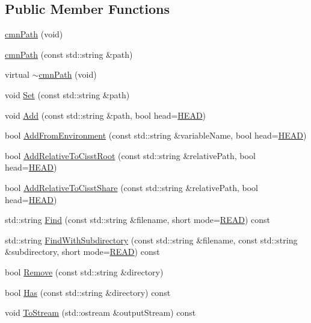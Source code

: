 \subsection*{Public Member Functions}
\begin{DoxyCompactItemize}
\item 
\hyperlink{classcmn_path_ae7372aae252f17f219353fddbbedabf8}{cmn\+Path} (void)
\item 
\hyperlink{classcmn_path_ac59578e065ce38a729b59fa9827619b0}{cmn\+Path} (const std\+::string \&path)
\item 
virtual \hyperlink{classcmn_path_aa518198d8cfca3efe29c53ecc4643fc5}{$\sim$cmn\+Path} (void)
\item 
void \hyperlink{classcmn_path_a322c6bb770d1c4eab76e607d1a1c42cc}{Set} (const std\+::string \&path)
\item 
void \hyperlink{classcmn_path_a9befae06a868615a5df0442298014db6}{Add} (const std\+::string \&path, bool head=\hyperlink{group__cisst_common_ggac052729bcebb4fcdcef7eaaa81c21ab9a53c54bb785ea4ed82a051ce4508f152a}{H\+E\+A\+D})
\item 
bool \hyperlink{classcmn_path_a98560267f6ffa9994df283b333cad870}{Add\+From\+Environment} (const std\+::string \&variable\+Name, bool head=\hyperlink{group__cisst_common_ggac052729bcebb4fcdcef7eaaa81c21ab9a53c54bb785ea4ed82a051ce4508f152a}{H\+E\+A\+D})
\item 
bool \hyperlink{classcmn_path_ac698e3725043e5f588cc10bc1e6c32a5}{Add\+Relative\+To\+Cisst\+Root} (const std\+::string \&relative\+Path, bool head=\hyperlink{group__cisst_common_ggac052729bcebb4fcdcef7eaaa81c21ab9a53c54bb785ea4ed82a051ce4508f152a}{H\+E\+A\+D})
\item 
bool \hyperlink{classcmn_path_a755f7ec7bdae368f1a63bcfbfcfd826e}{Add\+Relative\+To\+Cisst\+Share} (const std\+::string \&relative\+Path, bool head=\hyperlink{group__cisst_common_ggac052729bcebb4fcdcef7eaaa81c21ab9a53c54bb785ea4ed82a051ce4508f152a}{H\+E\+A\+D})
\item 
std\+::string \hyperlink{classcmn_path_a9a6b0ab7944a7fbb24485f8bf0769f1d}{Find} (const std\+::string \&filename, short mode=\hyperlink{group__cisst_common_gga15dacf9562d80d5b7eb9b849726e768caea0bb09a4a02da90f6c172531cd17a05}{R\+E\+A\+D}) const 
\item 
std\+::string \hyperlink{classcmn_path_a4f22b53ac0299045f641a4358999bc58}{Find\+With\+Subdirectory} (const std\+::string \&filename, const std\+::string \&subdirectory, short mode=\hyperlink{group__cisst_common_gga15dacf9562d80d5b7eb9b849726e768caea0bb09a4a02da90f6c172531cd17a05}{R\+E\+A\+D}) const 
\item 
bool \hyperlink{classcmn_path_a9bf81a4e84a5dfb0155931c62b6b202f}{Remove} (const std\+::string \&directory)
\item 
bool \hyperlink{classcmn_path_a53ba5d514e306f66fc46a4faea29a1eb}{Has} (const std\+::string \&directory) const 
\item 
void \hyperlink{classcmn_path_a5e3065cee44575c04db18e8b1e3c8174}{To\+Stream} (std\+::ostream \&output\+Stream) const 
\end{DoxyCompactItemize}
